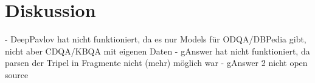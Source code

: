 \chapter{Diskussion}\label{ch:discussion}
- DeepPavlov hat nicht funktioniert, da es nur Models für ODQA/DBPedia gibt, nicht aber CDQA/KBQA mit eigenen Daten
- gAnswer hat nicht funktioniert, da parsen der Tripel in Fragmente nicht (mehr) möglich war
- gAnswer 2 nicht open source
